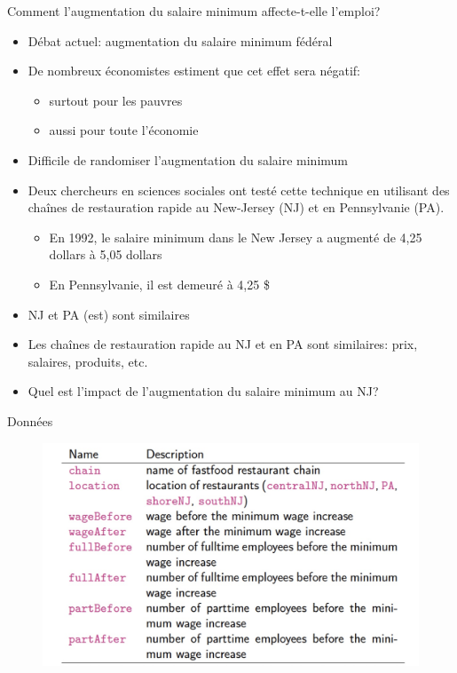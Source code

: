 \documentclass[ignorenonframetext,]{beamer}
\providecommand{\tightlist}{%
  \setlength{\itemsep}{0pt}\setlength{\parskip}{0pt}}
\begin{document}
\begin{frame}{Comment l'augmentation du salaire minimum affecte-t-elle
l'emploi?}
\protect\hypertarget{comment-laugmentation-du-salaire-minimum-affecte-t-elle-lemploi}{}

\begin{itemize}
\tightlist
\item
  Débat actuel: augmentation du salaire minimum fédéral
\item
  De nombreux économistes estiment que cet effet sera négatif:

  \begin{itemize}
  \tightlist
  \item
    surtout pour les pauvres
  \item
    aussi pour toute l'économie
  \end{itemize}
\item
  Difficile de randomiser l'augmentation du salaire minimum
\item
  Deux chercheurs en sciences sociales ont testé cette technique en
  utilisant des chaînes de restauration rapide au New-Jersey (NJ) et en
  Pennsylvanie (PA).

  \begin{itemize}
  \tightlist
  \item
    En 1992, le salaire minimum dans le New Jersey a augmenté de 4,25
    dollars à 5,05 dollars
  \item
    En Pennsylvanie, il est demeuré à 4,25 \$
  \end{itemize}
\item
  NJ et PA (est) sont similaires
\item
  Les chaînes de restauration rapide au NJ et en PA sont similaires:
  prix, salaires, produits, etc.
\item
  Quel est l'impact de l'augmentation du salaire minimum au NJ?
\end{itemize}

\end{frame}

\begin{frame}{Données}
\protect\hypertarget{donnees}{}

\begin{figure}
\includegraphics[width=0.8\linewidth]{minimum-wage} \end{figure}

\end{frame}
\end{document}
